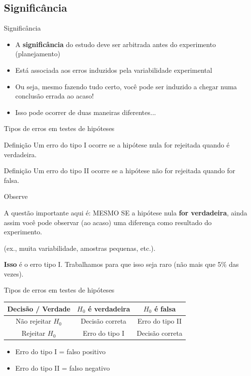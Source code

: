 \documentclass{beamer}
\begin{document}
\subsection{Significância}
\begin{frame}{Significância}
  \begin{itemize}
  \item A {\bf significância} do estudo deve ser arbitrada antes do experimento (planejamento)
  \item Está associada aos erros induzidos pela variabilidade experimental
  \item Ou seja, mesmo fazendo tudo certo, você pode ser induzido a chegar numa conclusão errada ao acaso!
  \item Isso pode ocorrer de duas maneiras diferentes...
  \end{itemize}
\end{frame}

\begin{frame}{Tipos de erros em testes de hipóteses}
  \begin{block}{Definição}
    Um \alert{erro do tipo I} ocorre se a hipótese nula for rejeitada
    quando é verdadeira.
  \end{block}
  \begin{block}{Definição}
    Um \alert{erro do tipo II} ocorre se a hipótese não for rejeitada
    quando for falsa.
  \end{block}
\end{frame}

\begin{frame}[label=observacao]{Observe}
  \begin{block}{A questão importante aqui é:}
    MESMO SE a hipótese nula {\bf for verdadeira}, ainda assim você pode observar (ao acaso) uma diferença como resultado do experimento.

    \bigskip
    (ex., muita variabilidade, amostras pequenas, etc.).

    \bigskip
    {\bf Isso} é o erro tipo I. Trabalhamos para que isso seja raro (não mais que 5\% das vezes).
  \end{block}
\end{frame}

\begin{frame}{Tipos de erros em testes de hipóteses}
  \begin{block}{}
    \begin{tabular}{c||c|c}
      Decisão / Verdade & $H_0$ é verdadeira & $H_0$ é falsa \\
      \hline
      \hline
      Não rejeitar $H_0$ & Decisão correta & Erro do tipo II\\
      \hline
      Rejeitar $H_0$ & Erro do tipo I & Decisão correta\\
    \end{tabular}
  \end{block}
  \begin{itemize}
  \item Erro do tipo I = falso positivo
  \item Erro do tipo II = falso negativo
  \end{itemize}
\end{frame}
\end{document}
